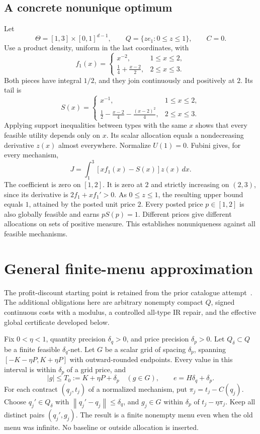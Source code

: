 \documentclass[11pt,a4paper]{article}
\numberwithin{equation}{section}
\newcommand{\norm}[1]{\left\lVert #1\right\rVert}
\begin{document}
\subsection{A concrete nonunique optimum}\label{sec:nonunique}
Let
\[
 \Theta=[1,3]\times[0,1]^{d-1},\qquad
 Q=\{ze_1:0\le z\le1\},\qquad C=0.
\]
Use a product density, uniform in the last coordinates, with
\[
 f_1(x)=
 \begin{cases}x^{-2},&1\le x\le2,\\
 \frac14+\frac{x-2}{2},&2\le x\le3.\end{cases}
\]
Both pieces have integral \(1/2\), and they join continuously and
positively at \(2\). Its tail is
\[
 S(x)=
 \begin{cases}x^{-1},&1\le x\le2,\\
 \frac12-\frac{x-2}{4}-\frac{(x-2)^2}{4},&2\le x\le3.
 \end{cases}
\]
Applying support inequalities between types with the same \(x\) shows
that every feasible utility depends only on \(x\).
Its scalar allocation equals a nondecreasing derivative \(z(x)\)
almost everywhere. Normalize \(U(1)=0\). Fubini gives, for every mechanism,
\[
 J=\int_1^3[xf_1(x)-S(x)]z(x)\,dx.
\]
The coefficient is zero on \([1,2]\). It is zero at \(2\) and strictly
increasing on \((2,3)\), since its derivative is \(2f_1+xf_1'>0\).
As \(0\le z\le1\), the resulting upper bound equals \(1\), attained
by the posted unit price \(2\).
Every posted price \(p\in[1,2]\) is also globally feasible and earns
\(pS(p)=1\). Different prices give different allocations on sets of
positive measure. This establishes nonuniqueness against all feasible
mechanisms.

\section{General finite-menu approximation}\label{sec:rounding}
The profit-discount starting point is retained from the prior catalogue
attempt~\cite{PriorAttempt}. The additional obligations here are arbitrary
nonempty compact \(Q\), signed continuous costs with a modulus, a
controlled all-type IR repair, and the effective global certificate
developed below.

Fix \(0<\eta<1\), quantity precision \(\delta_q>0\), and price precision
\(\delta_p>0\).
Let \(Q_\delta\subset Q\) be a finite feasible \(\delta_q\)-net.
Let \(G\) be a scalar grid of spacing \(\delta_p\), spanning
\([-K-\eta P,K+\eta P]\) with outward-rounded endpoints.
Every value in this interval is within \(\delta_p\) of a grid price, and
\[
 |g|\le T_0:=K+\eta P+\delta_p\quad(g\in G),\qquad
 e=H\delta_q+\delta_p.
\]
For each contract \((q_j,t_j)\) of a normalized mechanism, put
\(\pi_j=t_j-C(q_j)\). Choose \(q_j'\in Q_\delta\) with
\(\norm{q_j'-q_j}\le\delta_q\), and \(g_j\in G\) within \(\delta_p\)
of \(t_j-\eta\pi_j\). Keep all distinct pairs \((q_j',g_j)\).
The result is a finite nonempty menu even when the old menu was infinite.
No baseline or outside allocation is inserted.
\end{document}
